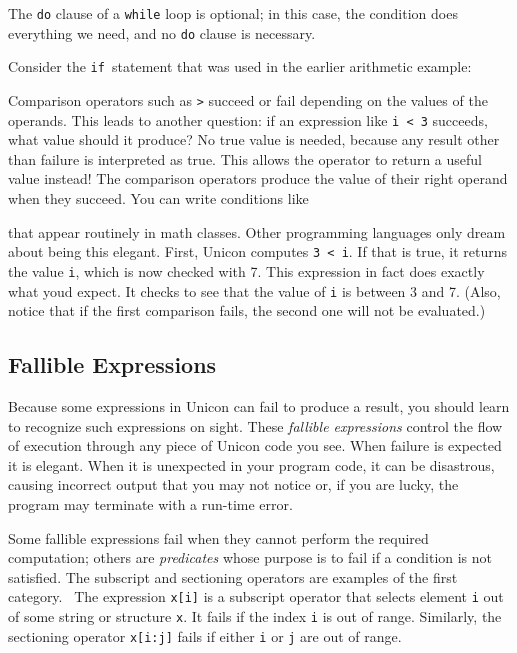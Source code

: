 
The \texttt{do} clause of a \texttt{while} loop is
optional; in this case, the condition does everything
we need, and no \texttt{do} clause is necessary.

Consider the \texttt{if}\texttt{ }statement that was
used in the earlier arithmetic example:


Comparison operators such as \texttt{{\textgreater}} succeed or fail
depending on the values of the operands. This leads to another
question: if an expression like \texttt{i {\textless} 3} succeeds, what
value should it produce? No {\textquotedbl}true{\textquotedbl} value is
needed, because any result other than failure is interpreted as
{\textquotedbl}true.{\textquotedbl} This allows the operator to return
a useful value instead! The comparison
operators produce the value of their right operand when they succeed.
You can write conditions like


\noindent
that appear routinely in math classes. Other programming languages only
dream about being this elegant. First, Unicon computes \texttt{3
{\textless} i}. If that is true, it returns the value \texttt{i}, which
is now checked with 7. This expression in fact does exactly what
you{\textquotesingle}d expect. It checks to see that the value of
\texttt{i} is between 3 and 7. (Also, notice that if the first
comparison fails, the second one will not be evaluated.)

\subsection{Fallible Expressions}

Because some expressions in Unicon can fail to
produce a result, you should learn to recognize such expressions on
sight. These \textit{fallible
expression}\textit{s} control the flow of execution through any piece
of Unicon code you see. When failure is expected it is elegant. When it
is unexpected in your program code, it can be disastrous, causing
incorrect output that you may not notice or, if you are lucky, the
program may terminate with a run-time error.

Some fallible expressions fail when they cannot perform the required
computation; others are \textit{predicates} whose purpose is to fail if
a condition is not satisfied. The subscript and sectioning operators are examples of the first category. \ The
expression \texttt{x[i]} is a subscript
operator that selects element \texttt{i} out of some string or
structure \texttt{x}. It fails if the index \texttt{i} is out of range.
Similarly, the sectioning operator \texttt{x[i:j]} fails if either
\texttt{i} or \texttt{j} are out of range.

